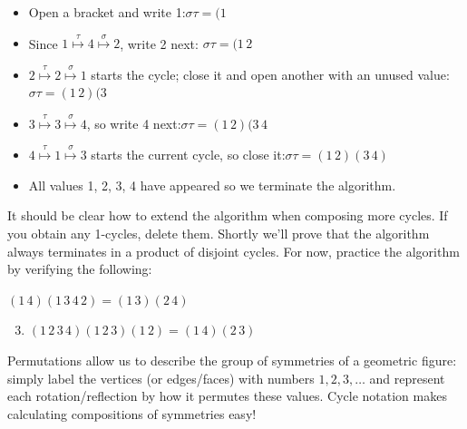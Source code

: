 \begin{itemize}\itemsep0pt
  \item Open a bracket and write 1:\hfill $\sigma\tau=(1\phantom{\,2)(3\,4)}$
  \item Since $1\overset{\tau}{\mapsto}4\overset{\sigma}{\mapsto}2$, write 2 next: \hfill $\sigma\tau=(1\,2\phantom{)(3\,4)}$
  \item $2\overset{\tau}{\mapsto}2\overset{\sigma}{\mapsto}1$ starts the cycle; close it and open another with an unused value:\hfill $\sigma\tau=(1\,2)(3\phantom{\,4)}$
  \item $3\overset{\tau}{\mapsto}3\overset{\sigma}{\mapsto}4$, so write 4 next:\hfill $\sigma\tau=(1\,2)(3\,4\phantom{)}$
  \item $4\overset{\tau}{\mapsto}1\overset{\sigma}{\mapsto}3$ starts the current cycle, so close it:\hfill $\sigma\tau=(1\,2)(3\,4)$
  \item All values 1, 2, 3, 4 have appeared so we terminate the algorithm.
\end{itemize}
It should be clear how to extend the algorithm when composing more cycles. If you obtain any 1-cycles, delete them. Shortly we'll prove that the algorithm always terminates in a product of disjoint cycles. For now, practice the algorithm by verifying the following:

\begin{examples}{}{}
\exstart $(1\,4)(1\,3\,4\,2)=(1\,3)(2\,4)$\hfill {}
\begin{enumerate}\setcounter{enumi}{2}
  \item $(1\,2\,3\,4)(1\,2\,3)(1\,2)=(1\,4)(2\,3)$\hfill {}
\end{enumerate}
\end{examples}


\goodbreak


Permutations allow us to describe the group of symmetries of a geometric figure: simply label the vertices (or edges/faces) with numbers $1,2,3,\ldots$ and represent each rotation/reflection by how it permutes these values. Cycle notation makes calculating compositions of symmetries easy!

